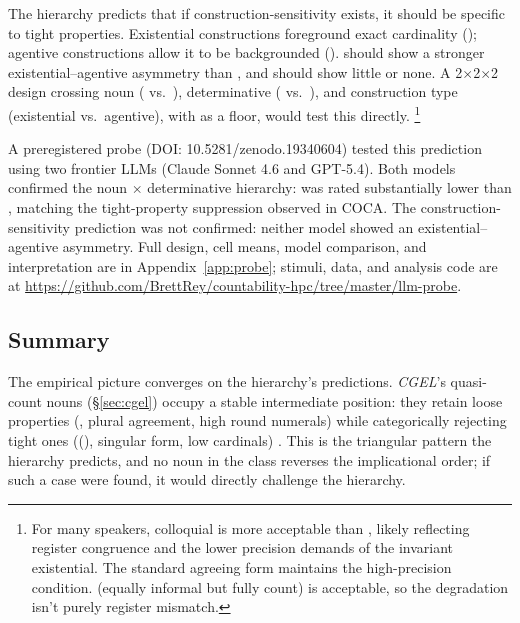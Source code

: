 \documentclass[12pt,a4paper]{article}
\begin{document}
The hierarchy predicts that if construction-sensitivity exists, it should be specific to tight properties. Existential constructions foreground exact cardinality (); agentive constructions allow it to be backgrounded ().  should show a stronger existential--agentive asymmetry than , and  should show little or none. A 2$\times$2$\times$2 design crossing noun ( vs.\ ), determinative ( vs.\ ), and construction type (existential vs.\ agentive), with  as a floor, would test this directly.%
\footnote{For many speakers, colloquial  is more acceptable than , likely reflecting register congruence and the lower precision demands of the invariant existential. The standard agreeing form  maintains the high-precision condition.  (equally informal but fully count) is acceptable, so the  degradation isn't purely register mismatch.}

A preregistered probe (DOI: 10.5281/zenodo.19340604) tested this prediction using two frontier LLMs (Claude Sonnet 4.6 and GPT-5.4). Both models confirmed the noun $\times$ determinative hierarchy:  was rated substantially lower than , matching the tight-property suppression observed in COCA. The construction-sensitivity prediction was not confirmed: neither model showed an existential--agentive asymmetry. Full design, cell means, model comparison, and interpretation are in Appendix~\ref{app:probe}; stimuli, data, and analysis code are at \url{https://github.com/BrettRey/countability-hpc/tree/master/llm-probe}.

\subsection{Summary}

The empirical picture converges on the hierarchy's predictions. \textit{CGEL}'s quasi-count nouns (\S\ref{sec:cgel}) occupy a stable intermediate position: they retain loose properties (, plural agreement, high round numerals) while categorically rejecting tight ones ((), singular form, low cardinals) \citep[p.~345]{huddleston2002}. This is the triangular pattern the hierarchy predicts, and no noun in the class reverses the implicational order; if such a case were found, it would directly challenge the hierarchy.
\end{document}
